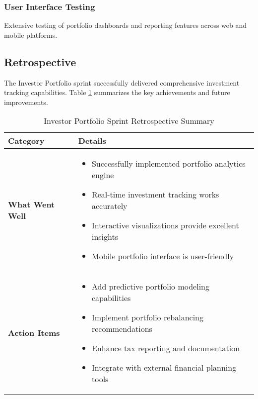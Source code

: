 \subsubsection{User Interface Testing}
Extensive testing of portfolio dashboards and reporting features across web and mobile platforms.

\subsection{Retrospective}

The Investor Portfolio sprint successfully delivered comprehensive investment tracking capabilities. Table \ref{tab:investor-portfolio-retrospective} summarizes the key achievements and future improvements.

\begin{table}[htbp]
    \centering
    \begin{tabular}{|p{3cm}|p{10cm}|}
        \hline
        \textbf{Category} & \textbf{Details} \\
        \hline
        \textbf{What Went Well} & 
        \begin{itemize}
            \item Successfully implemented portfolio analytics engine
            \item Real-time investment tracking works accurately
            \item Interactive visualizations provide excellent insights
            \item Mobile portfolio interface is user-friendly
        \end{itemize} \\
        \hline
        \textbf{Action Items} & 
        \begin{itemize}
            \item Add predictive portfolio modeling capabilities
            \item Implement portfolio rebalancing recommendations
            \item Enhance tax reporting and documentation
            \item Integrate with external financial planning tools
        \end{itemize} \\
        \hline
    \end{tabular}
    \caption{Investor Portfolio Sprint Retrospective Summary}
    \label{tab:investor-portfolio-retrospective}
\end{table}

 